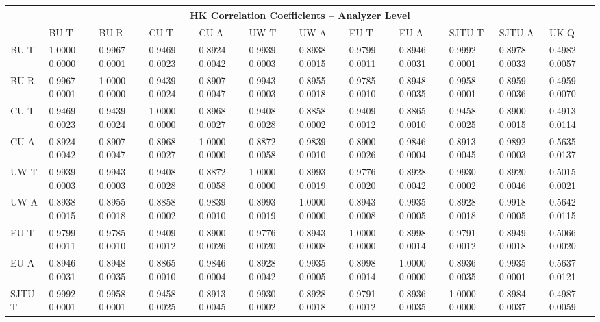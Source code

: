 
\begin{landscape}
\begin{table}
\small
\centering
\renewcommand{\arraystretch}{1.5}
\begin{tabularx}{1\linewidth}{@{\extracolsep{\fill}}lXXXXXXXXXXX}
  \toprule
  	\multicolumn{12}{c}{{\normalsize HK Correlation Coefficients -- Analyzer Level}} \\
  \midrule
  	       & BU T & BU R & CU T & CU A & UW T & UW A & EU T & EU A & SJTU T & SJTU A & UK Q \\
  \midrule
	BU T   & 1.0000 0.0000 & 0.9967 0.0001 & 0.9469 0.0023 & 0.8924 0.0042 & 0.9939 0.0003 & 0.8938 0.0015 & 0.9799 0.0011 & 0.8946 0.0031 & 0.9992 0.0001 & 0.8978 0.0033 & 0.4982 0.0057  \\
	BU R   & 0.9967 0.0001 & 1.0000 0.0000 & 0.9439 0.0024 & 0.8907 0.0047 & 0.9943 0.0003 & 0.8955 0.0018 & 0.9785 0.0010 & 0.8948 0.0035 & 0.9958 0.0001 & 0.8959 0.0036 & 0.4959 0.0070  \\
	CU T   & 0.9469 0.0023 & 0.9439 0.0024 & 1.0000 0.0000 & 0.8968 0.0027 & 0.9408 0.0028 & 0.8858 0.0002 & 0.9409 0.0012 & 0.8865 0.0010 & 0.9458 0.0025 & 0.8900 0.0015 & 0.4913 0.0114  \\
	CU A   & 0.8924 0.0042 & 0.8907 0.0047 & 0.8968 0.0027 & 1.0000 0.0000 & 0.8872 0.0058 & 0.9839 0.0010 & 0.8900 0.0026 & 0.9846 0.0004 & 0.8913 0.0045 & 0.9892 0.0003 & 0.5635 0.0137  \\
	UW T   & 0.9939 0.0003 & 0.9943 0.0003 & 0.9408 0.0028 & 0.8872 0.0058 & 1.0000 0.0000 & 0.8993 0.0019 & 0.9776 0.0020 & 0.8928 0.0042 & 0.9930 0.0002 & 0.8920 0.0046 & 0.5015 0.0021  \\
	UW A   & 0.8938 0.0015 & 0.8955 0.0018 & 0.8858 0.0002 & 0.9839 0.0010 & 0.8993 0.0019 & 1.0000 0.0000 & 0.8943 0.0008 & 0.9935 0.0005 & 0.8928 0.0018 & 0.9918 0.0005 & 0.5642 0.0115  \\
	EU T   & 0.9799 0.0011 & 0.9785 0.0010 & 0.9409 0.0012 & 0.8900 0.0026 & 0.9776 0.0020 & 0.8943 0.0008 & 1.0000 0.0000 & 0.8998 0.0014 & 0.9791 0.0012 & 0.8949 0.0018 & 0.5066 0.0020  \\
	EU A   & 0.8946 0.0031 & 0.8948 0.0035 & 0.8865 0.0010 & 0.9846 0.0004 & 0.8928 0.0042 & 0.9935 0.0005 & 0.8998 0.0014 & 1.0000 0.0000 & 0.8936 0.0035 & 0.9935 0.0001 & 0.5637 0.0121  \\
	SJTU T & 0.9992 0.0001 & 0.9958 0.0001 & 0.9458 0.0025 & 0.8913 0.0045 & 0.9930 0.0002 & 0.8928 0.0018 & 0.9791 0.0012 & 0.8936 0.0035 & 1.0000 0.0000 & 0.8984 0.0037 & 0.4987 0.0059  \\

\end{tabularx}
\end{table}
\end{landscape}
